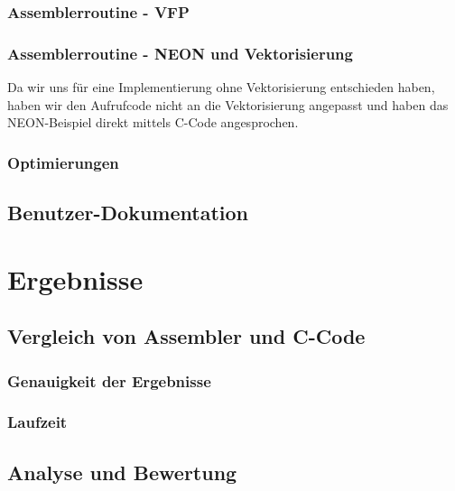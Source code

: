 \documentclass[11pt]{scrartcl}
\begin{document}
\subsubsection{Assemblerroutine - VFP}
\subsubsection{Assemblerroutine - NEON und Vektorisierung}
Da wir uns für eine Implementierung ohne Vektorisierung entschieden haben, haben wir den Aufrufcode nicht an die Vektorisierung angepasst und haben das NEON-Beispiel direkt mittels C-Code angesprochen.
\subsubsection{Optimierungen}
\subsection{Benutzer-Dokumentation}
\section{Ergebnisse}
\subsection{Vergleich von Assembler und C-Code}
\subsubsection{Genauigkeit der Ergebnisse}
\subsubsection{Laufzeit}
\subsection{Analyse und Bewertung}
\end{document}
